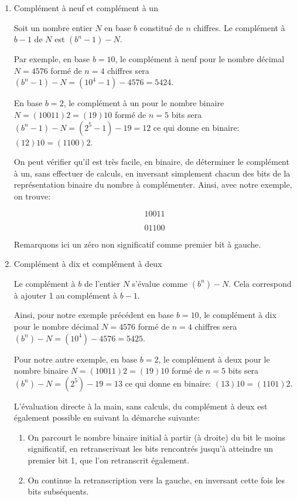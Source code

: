 \documentclass[letter, oneside]{book}
\begin{document}
\begin{enumerate}
\item Complément à neuf et complément à un
\label{sec:orgdab0829}

Soit un nombre entier \(N\) en base \(b\) constitué de \(n\) chiffres. Le
complément à \(b-1\) de \(N\) est \((b^n-1)-N\).

Par exemple, en base \(b=10\), le complément à neuf pour le nombre décimal
\(N = 4576\) formé de \(n=4\) chiffres sera \((b^n-1)-N = (10^4 -1) -
4576 = 5424\).

En base \(b=2\), le complément à un pour le nombre binaire \(N =
(10011)2 = (19)10\) formé de \(n=5\) bits sera \((b^n-1)-N = (2^5
-1) - 19 = 12\) ce qui donne en binaire: \((12)10 = (1100)2\).

On peut vérifier qu'il est très facile, en binaire, de déterminer le
complément à un, sans effectuer de calculs, en inversant simplement
chacun des bits de la représentation binaire du nombre à
complémenter. Ainsi, avec notre exemple, on trouve:

$$10011$$

$$01100$$

Remarquons ici un zéro non significatif comme premier bit à gauche.

\item Complément à dix et complément à deux
\label{sec:orgfe706c1}

Le complément à \(b\) de l'entier \(N\) s'évalue comme
\((b^n)-N\). Cela correspond à ajouter 1 au complément à \(b-1\).

Ainsi, pour notre exemple précédent en base \(b=10\), le complément à
dix pour le nombre décimal \(N = 4576\) formé de \(n=4\) chiffres sera
\((b^n)-N = (10^4) - 4576 = 5425\).

Pour notre autre exemple, en base \(b=2\), le complément à deux pour
le nombre binaire \(N = (10011)2 = (19)10\) formé de \(n=5\) bits
sera \((b^n)-N = (2^5) - 19 = 13\) ce qui donne en binaire:
\((13)10 = (1101)2\).

L'évaluation directe à la main, sans calculs, du complément à deux est
également possible en suivant la démarche suivante:
\begin{enumerate}
\item On parcourt le nombre binaire initial à partir (à droite) du bit le moins
significatif, en retranscrivant les bits rencontrés jusqu'à
atteindre un premier bit 1, que l'on retranscrit également.
\item On continue la retranscription vers la gauche, en inversant cette
fois les bits subséquents.
\end{enumerate}


\end{enumerate}
\end{document}
